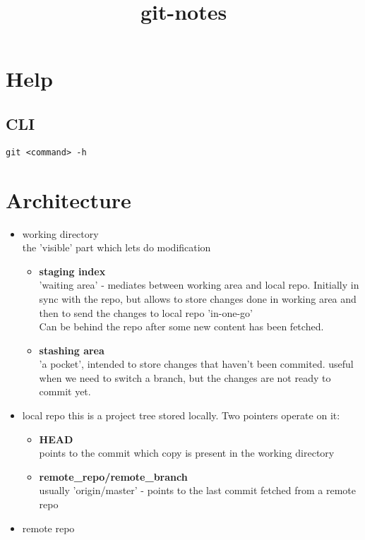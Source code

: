 \documentclass{report}
\title{git-notes}
\begin{document}
\maketitle
{}
\tableofcontents

\chapter{Help}

\section{CLI}
\begin{verbatim}
git <command> -h
\end{verbatim}



\chapter{Architecture}
\begin{itemize}
	\item working directory\\
           the 'visible' part which lets do modification
		\begin{itemize}
			\item \textbf{staging index}\\
				'waiting area' - mediates between working area and local repo. Initially in sync with the repo, 
				but allows to store changes done in working area and then to send the changes to local repo 'in-one-go'\\
				Can be behind the repo after some new content has been fetched.
	
			\item \textbf{stashing area}\\
			'a pocket', intended to store changes that haven't been commited. useful when we need to switch a branch, but the changes are not ready to commit yet.
		\end{itemize}

	\item local repo	
	this is a project tree stored locally. Two pointers operate on it:
\begin{itemize}
\item \textbf{HEAD}\\
points to the commit which copy is present in the working directory
\item \textbf{remote\_repo/remote\_branch}\\
usually 'origin/master' - points to the last commit fetched from a remote repo 
\end{itemize}

\item remote repo
\end{itemize}
\end{document}
